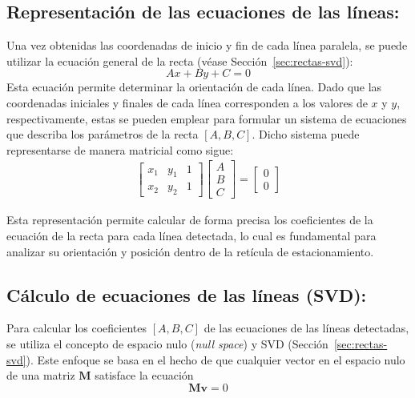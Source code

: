 \subsection{Representación de las ecuaciones de las líneas:}

Una vez obtenidas las coordenadas de inicio y fin de cada línea paralela, se puede utilizar la ecuación general de la recta (véase Sección~\ref{sec:rectas-svd}):
\begin{equation}
    Ax + By + C = 0
\end{equation}
Esta ecuación permite determinar la orientación de cada línea.
Dado que las coordenadas iniciales y finales de cada línea corresponden a los valores de $x$ y $y$, respectivamente,
estas se pueden emplear para formular un sistema de ecuaciones que describa los parámetros de la recta $[A, B, C]$.
Dicho sistema puede representarse de manera matricial como sigue:
\begin{equation}
    \begin{aligned}
        \left[\begin{array}{ccc}
                      x_1 & y_1 & 1 \\
                      x_2 & y_2 & 1
                  \end{array}\right]
        \begin{bmatrix}
            A \\
            B \\
            C
        \end{bmatrix}
        =
        \begin{bmatrix}
            0 \\
            0
        \end{bmatrix}
    \end{aligned}
\end{equation}

Esta representación permite calcular de forma precisa los coeficientes de la ecuación de la recta para cada línea detectada,
lo cual es fundamental para analizar su orientación y posición dentro de la retícula de estacionamiento.

\subsection{Cálculo de ecuaciones de las líneas (SVD):}

Para calcular los coeficientes $[A, B, C]$ de las ecuaciones de las líneas detectadas, se utiliza el concepto de espacio nulo (\emph{null space}) y SVD (Sección~\ref{sec:rectas-svd}).
Este enfoque se basa en el hecho de que cualquier vector en el espacio nulo de una matriz $\mathbf{M}$ satisface la ecuación
\begin{equation}
    \mathbf{Mv} = 0
\end{equation}


